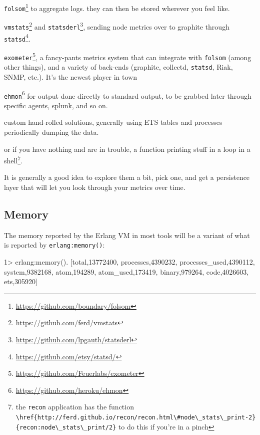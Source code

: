 \documentclass[11pt, oneside]{book}   	%
\newcommand{\app}[1]{\Verb`#1`}
\newcommand{\otpapp}[1]{\Verb`#1`}
\newcommand{\function}[1]{\Verb`#1`}
\newcommand{\expression}[1]{\Verb`#1`}
\begin{document}
\begin{itemize*}
	\item \otpapp{folsom}\footnote{\href{https://github.com/boundary/folsom}{https://github.com/boundary/folsom}} to aggregate logs. they can then be stored wherever you feel like.
	\item \otpapp{vmstats}\footnote{\href{https://github.com/ferd/vmstats}{https://github.com/ferd/vmstats}} and \otpapp{statsderl}\footnote{\href{https://github.com/lpgauth/statsderl}{https://github.com/lpgauth/statsderl}}, sending node metrics over to graphite through \app{statsd}\footnote{\href{https://github.com/etsy/statsd/}{https://github.com/etsy/statsd/}}.
	\item \otpapp{exometer}\footnote{\href{https://github.com/Feuerlabs/exometer}{https://github.com/Feuerlabs/exometer}}, a fancy-pants metrics system that can integrate with \otpapp{folsom} (among other things),  and a variety of back-ends (graphite, collectd, \app{statsd}, Riak, SNMP, etc.). It's the newest player in town
	\item \otpapp{ehmon}\footnote{\href{https://github.com/heroku/ehmon}{https://github.com/heroku/ehmon}} for output done directly to standard output, to be grabbed later through specific agents, splunk, and so on.
	\item custom hand-rolled solutions, generally using ETS tables and processes periodically dumping the data.
	\item or if you have nothing and are in trouble, a function printing stuff in a loop in a shell\footnote{the \otpapp{recon} application has the function \function{\href{http://ferd.github.io/recon/recon.html\#node\_stats\_print-2}{recon:node\_stats\_print/2}} to do this if you're in a pinch}.
\end{itemize*}

It is generally a good idea to explore them a bit, pick one, and get a persistence layer that will let you look through your metrics over time.

\subsection{Memory}

The memory reported by the Erlang VM in most tools will be a variant of what is reported by \expression{erlang:memory()}:

\begin{VerbatimEshell}
1> erlang:memory().
[{total,13772400},
 {processes,4390232},
 {processes_used,4390112},
 {system,9382168},
 {atom,194289},
 {atom_used,173419},
 {binary,979264},
 {code,4026603},
 {ets,305920}]
\end{VerbatimEshell}
\end{document}
